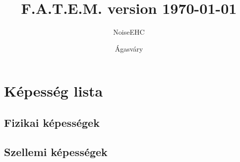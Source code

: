 


\author{NoiseEHC \and Ágasváry}
\title{F.A.T.E.M. version \today}





\pagestyle{empty}


\clearpage

\setmainfont[Ligatures=TeX,Scale=1.4]{EB Garamond}

\tableofcontents 

\pagestyle{fancy}
\renewcommand{\chaptermark}[1]{\markboth{#1}{}}
\setmainfont[Ligatures=TeX,Scale=1.4]{EB Garamond}


\clearpage

\clearpage


\clearpage


\clearpage

\clearpage

\clearpage


\clearpage

\clearpage

\clearpage

\chapter{Képesség lista}
\section{Fizikai képességek}

\clearpage

\clearpage

\clearpage

\clearpage

\clearpage

\clearpage
\section{Szellemi képességek}

\clearpage

\clearpage

\clearpage

\clearpage

\clearpage

\clearpage
